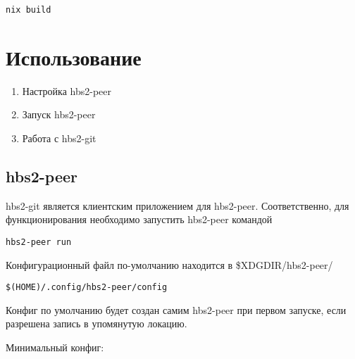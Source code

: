 \documentclass[11pt,a4paper]{article}
\begin{document}
\begin{verbatim}
nix build
\end{verbatim}

\section{Использование}

\begin{enumerate}
  \item Настройка hbs2-peer
  \item Запуск hbs2-peer
  \item Работа с hbs2-git
\end{enumerate}

\subsection{hbs2-peer}

hbs2-git является клиентским приложением для hbs2-peer.
Соответственно, для функционирования необходимо запустить hbs2-peer командой

\begin{verbatim}
hbs2-peer run
\end{verbatim}

Конфигурационный файл по-умолчанию находится в \$XDGDIR/hbs2-peer/

\begin{verbatim}
$(HOME)/.config/hbs2-peer/config
\end{verbatim}

Конфиг по умолчанию будет создан самим hbs2-peer при первом запуске,
если разрешена запись в упомянутую локацию.

Минимальный конфиг:
\end{document}
